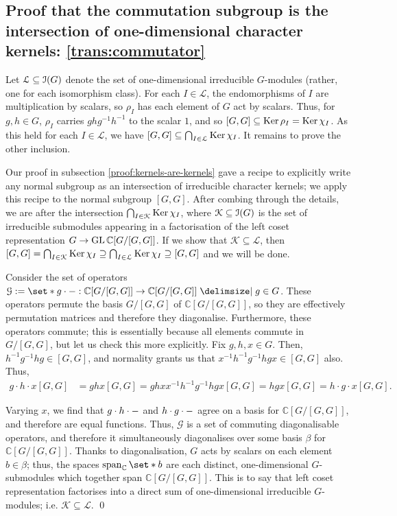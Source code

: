 \subsection{Proof that the commutation subgroup is the intersection of one-dimensional character kernels: \ref{trans:commutator}} %
\pan Let $\mathcal{L} \subseteq \operatorname{\mathcal{I}}(G)$ denote the set of one-dimensional irreducible $G$-modules (rather, one for each isomorphism class). For each $I \in \mathcal{L}$, the endomorphisms of $I$ are multiplication by scalars, so $\rho_I$ has each element of $G$ act by scalars. Thus, for $g, h \in G$, $\rho_I$ carries $g h g^{-1} h^{-1}$ to the scalar $1$, and so $[G, G] \subseteq \operatorname{Ker} \rho_I = \operatorname{Ker} \chi_I$. As this held for each $I \in \mathcal{L}$, we have $[G, G] \subseteq \bigcap_{I \in \mathcal{L}} \operatorname{Ker} \chi_I$. It remains to prove the other inclusion.
\par Our proof in subsection \ref{proof:kernels-are-kernels} gave a recipe to explicitly write any normal subgroup as an intersection of irreducible character kernels; we apply this recipe to the normal subgroup $[G, G]$. After combing through the details, we are after the intersection $\bigcap_{I \in \mathcal{K}} \operatorname{Ker} \chi_I$, where $\mathcal{K} \subseteq \operatorname{\mathcal{I}}(G)$ is the set of irreducible submodules appearing in a factorisation of the left coset representation $G \to \operatorname{GL} \mathbb{C}[G / [G, G]]$. If we show that $\mathcal{K} \subseteq \mathcal{L}$, then $[G, G] = \bigcap_{I \in \mathcal{K}} \operatorname{Ker} \chi_I \supseteq \bigcap_{I \in \mathcal{L}} \operatorname{Ker} \chi_I \supseteq [G, G]$ and we will be done.
\par Consider the set of operators $
  \mathcal{G}
  := \set*{
    g \cdot \blank
    : \mathbb{C}[G / [G, G]] \to \mathbb{C}[G / [G, G]]
  \given
    g \in G
  }
$. These operators permute the basis $G / [G, G]$ of $\mathbb{C}[G / [G, G]]$, so they are effectively permutation matrices and therefore they diagonalise. Furthermore, these operators commute; this is essentially because all elements commute in $G / [G, G]$, but let us check this more explicitly. Fix $g, h, x \in G$. Then, $h^{-1} g^{-1} h g \in [G, G]$, and normality grants us that $x^{-1} h^{-1} g^{-1} h g x \in [G, G]$ also. Thus,
\begin{align*}
  g \cdot h \cdot x [G, G]
  &= g h x [G, G]
  = g h x x^{-1} h^{-1} g^{-1} h g x [G, G]
  = h g x [G, G]
  = h \cdot g \cdot x [G, G]
  .
\end{align*}
\par Varying $x$, we find that $g \cdot h \cdot {-}$ and $h \cdot g \cdot {-}$ agree on a basis for $\mathbb{C}[G / [G, G]]$, and therefore are equal functions. Thus, $\mathcal{G}$ is a set of commuting diagonalisable operators, and therefore it simultaneously diagonalises over some basis $\beta$ for $\mathbb{C}[G / [G, G]]$. Thanks to diagonalisation, $G$ acts by scalars on each element $b \in \beta$; thus, the spaces $\spans_{\mathbb{C}} \set*{ b }$ are each distinct, one-dimensional $G$-submodules which together span $\mathbb{C}[G / [G, G]]$. This is to say that left coset representation factorises into a direct sum of one-dimensional irreducible $G$-modules; i.e. $\mathcal{K} \subseteq \mathcal{L}$. \qed

